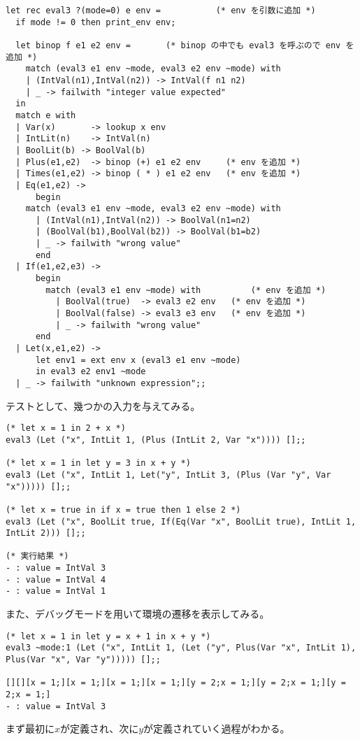 \documentclass[a4paper,9pt]{jsarticle}
\begin{document}
\begin{lstlisting}
let rec eval3 ?(mode=0) e env =           (* env を引数に追加 *)
  if mode != 0 then print_env env;

  let binop f e1 e2 env =       (* binop の中でも eval3 を呼ぶので env を追加 *)
    match (eval3 e1 env ~mode, eval3 e2 env ~mode) with
    | (IntVal(n1),IntVal(n2)) -> IntVal(f n1 n2)
    | _ -> failwith "integer value expected"
  in 
  match e with
  | Var(x)       -> lookup x env
  | IntLit(n)    -> IntVal(n)
  | BoolLit(b) -> BoolVal(b)
  | Plus(e1,e2)  -> binop (+) e1 e2 env     (* env を追加 *)
  | Times(e1,e2) -> binop ( * ) e1 e2 env   (* env を追加 *)
  | Eq(e1,e2) ->
      begin
	match (eval3 e1 env ~mode, eval3 e2 env ~mode) with
	  | (IntVal(n1),IntVal(n2)) -> BoolVal(n1=n2)
	  | (BoolVal(b1),BoolVal(b2)) -> BoolVal(b1=b2)
	  | _ -> failwith "wrong value"
      end
  | If(e1,e2,e3) ->
      begin
        match (eval3 e1 env ~mode) with          (* env を追加 *)
          | BoolVal(true)  -> eval3 e2 env   (* env を追加 *)
          | BoolVal(false) -> eval3 e3 env   (* env を追加 *)
          | _ -> failwith "wrong value"
      end
  | Let(x,e1,e2) -> 
      let env1 = ext env x (eval3 e1 env ~mode)
      in eval3 e2 env1 ~mode
  | _ -> failwith "unknown expression";; 
\end{lstlisting}
テストとして、幾つかの入力を与えてみる。

\begin{lstlisting}
(* let x = 1 in 2 + x *)
eval3 (Let ("x", IntLit 1, (Plus (IntLit 2, Var "x")))) [];; 

(* let x = 1 in let y = 3 in x + y *)
eval3 (Let ("x", IntLit 1, Let("y", IntLit 3, (Plus (Var "y", Var "x"))))) [];;

(* let x = true in if x = true then 1 else 2 *)
eval3 (Let ("x", BoolLit true, If(Eq(Var "x", BoolLit true), IntLit 1, IntLit 2))) [];;

(* 実行結果 *)
- : value = IntVal 3
- : value = IntVal 4
- : value = IntVal 1
\end{lstlisting}

また、デバッグモードを用いて環境の遷移を表示してみる。

\begin{lstlisting}
(* let x = 1 in let y = x + 1 in x + y *)
eval3 ~mode:1 (Let ("x", IntLit 1, (Let ("y", Plus(Var "x", IntLit 1), Plus(Var "x", Var "y"))))) [];;

[][][x = 1;][x = 1;][x = 1;][x = 1;][y = 2;x = 1;][y = 2;x = 1;][y = 2;x = 1;]
- : value = IntVal 3
\end{lstlisting}
まず最初に$x$が定義され、次に$y$が定義されていく過程がわかる。
\end{document}
